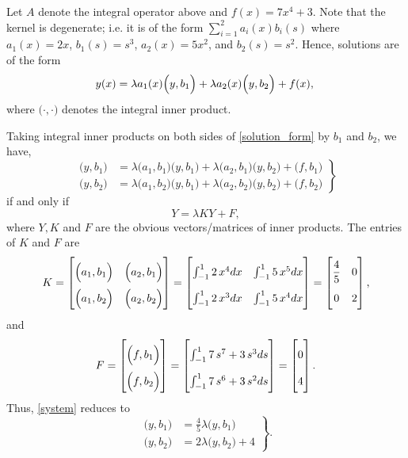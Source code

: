\documentclass{homework}
\begin{document}
\begin{solution}
  Let $A$ denote the integral operator above and $f(x) = 7x^4+3$.  Note that the kernel is degenerate; i.e. it is of the form $\sum_{i=1}^2 a_i(x)b_i(s)$ where $a_1(x) = 2x$, $b_1(s) =  s^3$, $a_2(x)=5x^2$, and $b_2(s)=s^2$. 
  Hence, solutions are of the form
  \begin{equation}
    y(x) = \lambda a_1(x) \Big(y,b_1\Big) + \lambda a_2(x)\Big(y,b_2\Big) + f(x), \label{solution_form}\\
  \end{equation}
  where $\Big( \cdot,\cdot\Big)$ denotes the integral inner product.

  Taking integral inner products on both sides of \eqref{solution_form} by $b_1$ and $b_2$, we have,
  \begin{equation}
  \left.
  \begin{array}{rl}
    \Big(y,b_1\Big) &= \lambda \Big(a_1,b_1\Big)\Big(y,b_1\Big) + \lambda \Big(a_2,b_1\Big)\Big(y,b_2\Big) + \Big(f,b_1\Big)\\
    \Big(y,b_2\Big) &= \lambda \Big(a_1,b_2\Big)\Big(y,b_1\Big) + \lambda \Big(a_2,b_2\Big)\Big(y,b_2\Big) + \Big(f,b_2\Big)
    \end{array}
  \right\} \label{system}
  \end{equation}
  if and only if
  $$
    Y = \lambda KY + F,
  $$
  where $Y,K$ and $F$ are the obvious vectors/matrices of inner products.  The entries of $K$ and $F$ are
  $$
    \renewcommand{\arraystretch}{2}
    K = \begin{bmatrix}
	\Big(a_1,b_1\Big) & \Big(a_2,b_1\Big)\\
	\Big(a_1,b_2\Big) & \Big(a_2,b_2\Big)\\
    \end{bmatrix}
    =
     \begin{bmatrix}
	\int_{-1}^12\,x^4dx  & \int_{-1}^15\,x^5dx\cr 
	\int_{-1}^12\,x^3 dx  & \int_{-1}^15\,x^4 dx\cr 
     \end{bmatrix}
    =
      \begin{bmatrix}
	{\displaystyle \frac{4}{5}}&0\cr 0&2\cr
      \end{bmatrix}, 
  $$
  and
  $$
    \renewcommand{\arraystretch}{2}
    F = 
	\begin{bmatrix}
	 \Big(f,b_1\Big) \\
	 \Big(f,b_2\Big) 
	\end{bmatrix} 
      =
	\begin{bmatrix}
	  \int_{-1}^17\,s^7+3\,s^3ds\cr 
	  \int_{-1}^17\,s^6+3\,s^2ds\cr 
	\end{bmatrix} 
      =
	\begin{bmatrix}
	 0\\
	 4
	\end{bmatrix}.
  $$
  Thus, \eqref{system} reduces to
  \begin{equation}
  \left.
  \begin{array}{rl}
    \Big(y,b_1\Big) &= \frac 45\lambda \Big(y,b_1\Big)\\
    \Big(y,b_2\Big) &= 2\lambda  \Big(y,b_2\Big) + 4
    \end{array}
  \right\}. \label{reduced_system}
  \end{equation}


\end{solution}
\end{document}
